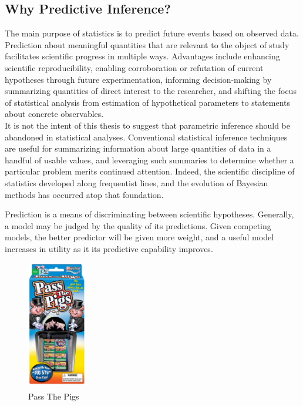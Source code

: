 \documentclass[12pt, a4paper]{article}
\begin{document}
  \subsection{Why Predictive Inference?}

The main purpose of statistics is to predict future events based on observed data.  Prediction about meaningful quantities that are relevant to the object of study facilitates scientific progress in multiple ways.  Advantages include enhancing scientific reproducibility, enabling corroboration or refutation of current hypotheses through future experimentation, informing decision-making by summarizing quantities of direct interest to the researcher, and shifting the focus of statistical analysis from estimation of hypothetical parameters to statements about concrete observables.\\

    It is not the intent of this thesis to suggest that parametric inference should be abandoned in statistical analyses.  Conventional statistical inference techniques are useful for summarizing information about large quantities of data in a handful of usable values, and leveraging such summaries to determine whether a particular problem merits continued attention.  Indeed, the scientific discipline of statistics developed along frequentist lines, and the evolution of Bayesian methods has occurred atop that foundation.

    Prediction is a means of discriminating between scientific hypotheses.  Generally, a model may be judged by the quality of its predictions.  Given competing models, the better predictor will be given more weight, and a useful model increases in utility as it its predictive capability improves.

\begin{figure}
  \begin{center}
    \includegraphics[width=0.23\textwidth]{./Graphics/PassThePigs/PtPBox}
  \end{center}
  \caption{Pass The Pigs\textsuperscript{\circledR}}
\end{figure}
\end{document}
